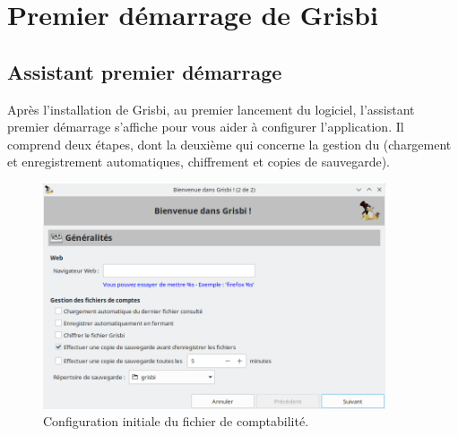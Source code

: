 

\chapter{Premier démarrage de Grisbi\label{start}}


\section{Assistant premier démarrage\label{start-first}}


Après l'installation de Grisbi, au premier lancement du logiciel, l'assistant premier démarrage s'affiche pour
vous aider à configurer l'application. Il comprend deux étapes, dont la deuxième qui concerne
la gestion du  (chargement et enregistrement automatiques, chiffrement et copies de sauvegarde).

\begin{figure}[htbp]
	\begin{center}
		\includegraphics[width=0.9\textwidth]{image/screenshot/start_first_launch}
	\end{center}
	\caption{Configuration initiale du fichier de comptabilité.}
	\label{start_first_launch}
\end{figure}

